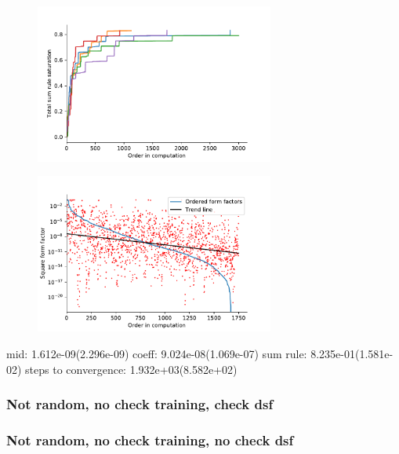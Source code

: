 \documentclass[11pt, a4paper]{report} %
\begin{document}
\begin{figure}[tb!]
  \centering
  \includegraphics[width=0.7\textwidth]{saturation_history_nn_check_train_nocheck_eval.pdf}
\end{figure}

\begin{figure}[tb!]
  \centering
  \includegraphics[width=0.7\textwidth]{ffsizes_nn_check_train_nocheck_eval.pdf}
\end{figure}

mid: 1.612e-09(2.296e-09)
coeff: 9.024e-08(1.069e-07)
sum rule: 8.235e-01(1.581e-02)
steps to convergence: 1.932e+03(8.582e+02)

\subsubsection{Not random, no check training, check dsf}

\subsubsection{Not random, no check training, no check dsf}
\end{document}
